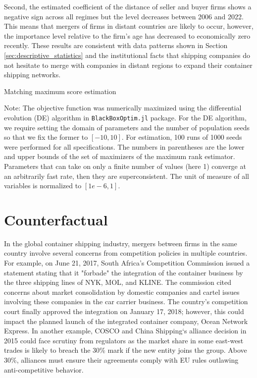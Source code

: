 \documentclass[10pt]{article}
\begin{document}
Second, the estimated coefficient of the distance of seller and buyer firms shows a negative sign across all regimes but the level decreases between 2006 and 2022. 
This means that mergers of firms in distant countries are likely to occur, however, the importance level relative to the firm's age has decreased to economically zero recently.
These results are consistent with data patterns shown in Section \ref{sec:descriptive_statistics} and the institutional facts that shipping companies do not hesitate to merge with companies in distant regions to expand their container shipping networks.

\begin{table}[!htbp]
  \begin{center}
      \caption{Matching maximum score estimation}
      \label{tb:maximum_score_estimate} 
      
  \end{center}\footnotesize
  Note: The objective function was numerically maximized using the differential evolution (DE) algorithm in \texttt{BlackBoxOptim.jl} package. For the DE algorithm, we require setting the domain of parameters and the number of population seeds so that we fix the former to $[-10, 10]$. For estimation, 100 runs of 1000 seeds were performed for all specifications. The numbers in parentheses are the lower and upper bounds of the set of maximizers of the maximum rank estimator. Parameters that can take on only a finite number of values (here 1) converge at an arbitrarily fast rate, then they are superconsistent. The unit of measure of all variables is normalized to $[1e-6,1]$. 
\end{table} 

\section{Counterfactual}\label{sec:counterfactuals}

In the global container shipping industry, mergers between firms in the same country involve several concerns from competition policies in multiple countries.
For example, on June 21, 2017, South Africa's Competition Commission issued a statement stating that it "forbade" the integration of the container business by the three shipping lines of NYK, MOL, and KLINE. 
The commission cited concerns about market consolidation by domestic companies and cartel issues involving these companies in the car carrier business.
The country's competition court finally approved the integration on January 17, 2018; however, this could impact the planned launch of the integrated container company, Ocean Network Express. 
In another example, COSCO and China Shipping`s alliance decision in 2015 could face scrutiny from regulators as the market share in some east-west trades is likely to breach the 30\% mark if the new entity joins the group. Above 30\%, alliances must ensure their agreements comply with EU rules outlawing anti-competitive behavior.
\end{document}
